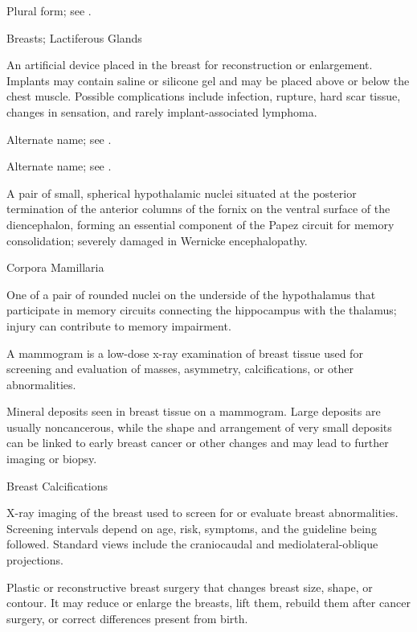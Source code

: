  Plural form; see .

\synonyms
Breasts; Lactiferous Glands

 An artificial device placed in the breast for reconstruction or enlargement. Implants may contain saline or silicone gel and may be placed above or below the chest muscle. Possible complications include infection, rupture, hard scar tissue, changes in sensation, and rarely implant-associated lymphoma.

 Alternate name; see .

 Alternate name; see .

 A pair of small, spherical hypothalamic nuclei situated at the posterior termination of the anterior columns of the fornix on the ventral surface of the diencephalon, forming an essential component of the Papez circuit for memory consolidation; severely damaged in Wernicke encephalopathy.

\synonyms
Corpora Mamillaria

 One of a pair of rounded nuclei on the underside of the hypothalamus that participate in memory circuits connecting the hippocampus with the thalamus; injury can contribute to memory impairment.

 A mammogram is a low-dose x-ray examination of breast tissue used for screening and evaluation of masses, asymmetry, calcifications, or other abnormalities.

 Mineral deposits seen in breast tissue on a mammogram. Large deposits are usually noncancerous, while the shape and arrangement of very small deposits can be linked to early breast cancer or other changes and may lead to further imaging or biopsy.

\synonyms
Breast Calcifications

 X-ray imaging of the breast used to screen for or evaluate breast abnormalities. Screening intervals
depend on age, risk, symptoms, and the guideline being followed. Standard views include
the craniocaudal and mediolateral-oblique projections.

 Plastic or reconstructive breast surgery that changes breast size, shape, or contour. It may reduce or enlarge the breasts, lift them, rebuild them after cancer surgery, or correct differences present from birth.

